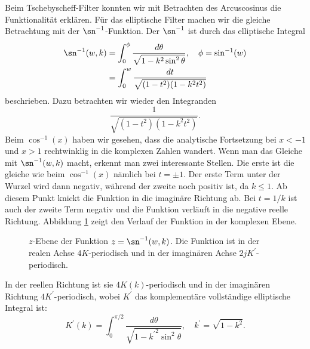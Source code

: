 Beim Tschebyscheff-Filter konnten wir mit Betrachten des Arcuscosinus die Funktionalität erklären.
Für das elliptische Filter machen wir die gleiche Betrachtung mit der $\sn^{-1}$-Funktion.
Der $\sn^{-1}$ ist durch das elliptische Integral
%
%
\begin{align}
    \sn^{-1}(w, k)
        & =
    \int_{0}^{\phi}
    \frac{
        d\theta
    }{
        \sqrt{
            1-k^2 \sin^2 \theta
        }
    },
    \quad
    \phi = \sin^{-1}(w)
    \\
        & =
    \int_{0}^{w}
    \frac{
        dt
    }{
        \sqrt{
            (1-t^2)(1-k^2 t^2)
        }
    }
\end{align}
beschrieben.
Dazu betrachten wir wieder den Integranden
\begin{equation}
    \frac{
        1
    }{
        \sqrt{
            (1-t^2)(1-k^2 t^2)
        }
    }.
\end{equation}
Beim $\cos^{-1}(x)$ haben wir gesehen, dass die analytische Fortsetzung bei $x < -1$ und $x > 1$ rechtwinklig in die komplexen Zahlen wandert.
Wenn man das Gleiche mit $\sn^{-1}(w, k)$ macht, erkennt man zwei interessante Stellen.
Die erste ist die gleiche wie beim $\cos^{-1}(x)$ nämlich bei $t = \pm 1$.
Der erste Term unter der Wurzel wird dann negativ, während der zweite noch positiv ist, da $k \leq 1$.
Ab diesem Punkt knickt die Funktion in die imaginäre Richtung ab.
Bei $t = 1/k$ ist auch der zweite Term negativ und die Funktion verläuft in die negative reelle Richtung.
Abbildung \ref{ellfilter:fig:sn} zeigt den Verlauf der Funktion in der komplexen Ebene.
\begin{figure}
    \centering
    
    \caption{
        $z$-Ebene der Funktion $z = \sn^{-1}(w, k)$.
        Die Funktion ist in der realen Achse $4K$-periodisch und in der imaginären Achse $2jK^\prime$-periodisch.
    }
    \label{ellfilter:fig:sn}
\end{figure}
In der reellen Richtung ist sie $4K(k)$-periodisch und in der imaginären Richtung $4K^\prime$-periodisch, wobei $K^\prime$ das komplementäre vollständige elliptische Integral ist:
%
%
\begin{equation}
    K^\prime(k)
    =
    \int_{0}^{\pi / 2}
    \frac{
        d\theta
    }{
        \sqrt{
            1-{k^\prime}^2 \sin^2 \theta
        }
    },
    \quad
    k^\prime = \sqrt{1-k^2}.
\end{equation}
